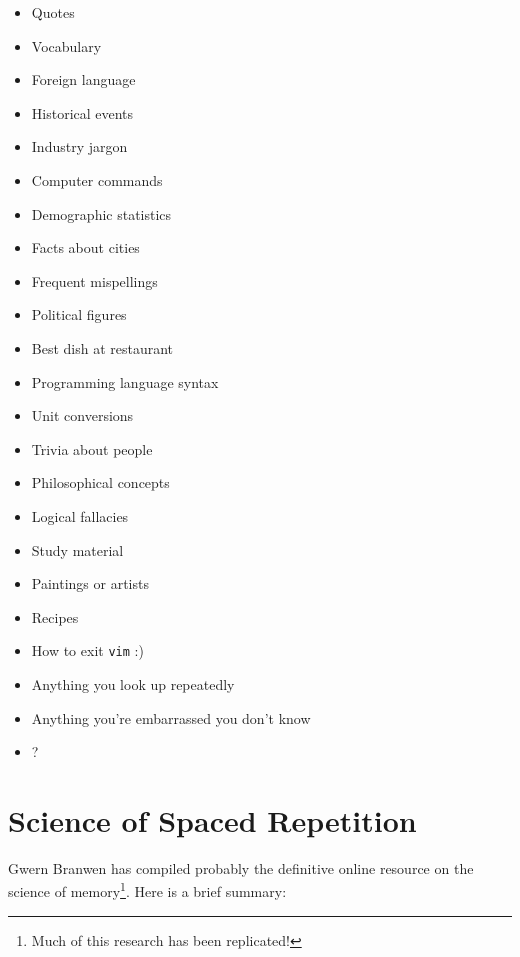 \documentclass[]{tufte-handout}
\begin{document}
\begin{fullwidth}

\begin{multicols}{4}
\begin{itemize}
    \item Quotes
    \item Vocabulary
    \item Foreign language
    \item Historical events
    \item Industry jargon
    \item Computer commands
    \item Demographic statistics
    \item Facts about cities
    \item Frequent mispellings
    \item Political figures
    \item Best dish at restaurant
    \item Programming language syntax
    \item Unit conversions
    \item Trivia about people
    \item Philosophical concepts
    \item Logical fallacies
    \item Study material
    \item Paintings or artists
    \item Recipes
    \item How to exit \texttt{vim} :)
    \item Anything you look up repeatedly
    \item Anything you're embarrassed you don't know
    \item ?
\end{itemize}
\end{multicols}

\end{fullwidth}

\section{Science of Spaced Repetition}

Gwern Branwen has compiled probably the definitive online resource\cite{gwern} on the science of memory\footnote{Much of this research has been replicated!}. Here is a brief summary:
\end{document}
